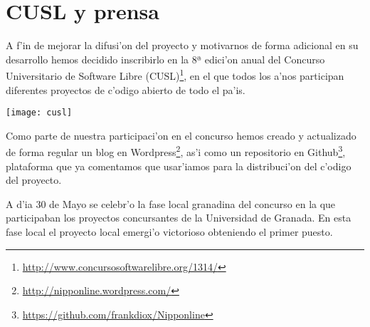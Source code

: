 \section{CUSL y prensa}
\label{sub:cusl_y_prensa}

A f'in de mejorar la difusi'on del proyecto y motivarnos de forma adicional en su desarrollo hemos decidido inscribirlo
en la 8ª edici'on anual del Concurso Universitario de Software Libre 
(CUSL)\footnote{\url{http://www.concursosoftwarelibre.org/1314/}}, en el que todos los a'nos participan diferentes
proyectos de c'odigo abierto de todo el pa'is.

\begin{center}
\texttt{[image: cusl]}
\end{center}

Como parte de nuestra participaci'on en el concurso hemos creado y actualizado de forma regular un blog en 
Wordpress\footnote{\url{http://nipponline.wordpress.com/}}, as'i como un repositorio en 
Github\footnote{\url{https://github.com/frankdiox/Nipponline}}, plataforma que ya comentamos que usar'iamos para 
la distribuci'on del c'odigo del proyecto.

A d'ia 30 de Mayo se celebr'o la fase local granadina del concurso en la que participaban los proyectos concursantes 
de la Universidad de Granada. En esta fase local el proyecto local emergi'o victorioso obteniendo el primer 
puesto\cite{cuslwinner}.
